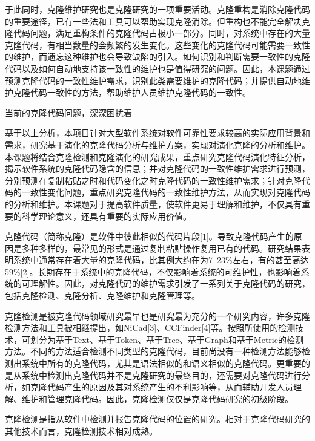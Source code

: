 于此同时，克隆维护研究也是克隆研究的一项重要活动。克隆重构是消除克隆代码的重要途径，已有一些法和工具可以帮助实现克隆消除。但重构也不能完全解决克隆代码问题，满足重构条件的克隆代码占极小一部分。同时，对系统中存在的大量克隆代码，有相当数量的会频繁的发生变化。这些变化的克隆代码可能需要一致性的维护，而遗忘这种维护也会导致缺陷的引入。如何识别和判断需要一致性的克隆代码以及如何自动地支持该一致性的维护也是值得研究的问题。因此，本课题通过预测克隆代码的一致性维护需求，识别此类需要维护的克隆代码；并提供自动地维护克隆代码一致性的方法，帮助维护人员维护克隆代码的一致性。

当前的克隆代码问题，深深困扰着

基于以上分析，本项目针对大型软件系统对软件可靠性要求较高的实际应用背景和需求，研究基于演化的克隆代码分析与维护方案，实现对演化克隆的分析和维护。本课题将结合克隆检测和克隆演化的研究成果，重点研究克隆代码演化特征分析，揭示软件系统的克隆代码隐含的信息；并对克隆代码的一致性维护需求进行预测，分别预测在复制粘贴之时和代码变化之时克隆代码的一致性维护需求；针对克隆代码的一致性变化问题，重点研究克隆代码的一致性维护方法，从而实现对克隆代码的分析和维护。本课题对于提高软件质量，使软件更易于理解和维护，不仅具有重要的科学理论意义，还具有重要的实际应用价值。



克隆代码（简称克隆）是软件中彼此相似的代码片段[1]。导致克隆代码产生的原因是多种多样的，最常见的形式是通过复制粘贴操作复用已有的代码。研究结果表明系统中通常存在着大量的克隆代码，比其例大约在为7~23\%左右，有的甚至高达59\%[2]。长期存在于系统中的克隆代码，不仅影响着系统的可维护性，也影响着系统的可理解性。因此，对克隆代码的维护需求引发了一系列关于克隆代码的研究，包括克隆检测、克隆分析、克隆维护和克隆管理等。


克隆检测是被克隆代码领域研究最早也是研究最为充分的一个研究内容，许多克隆检测方法和工具被相继提出，如NiCad[3]、CCFinder[4]等。按照所使用的检测技术，可划分为基于Text、基于Token、基于Tree、基于Graph和基于Metric的检测方法。不同的方法适合检测不同类型的克隆代码，目前尚没有一种检测方法能够检测出系统中所有的克隆代码，尤其是语法相似的和语义相似的克隆代码。更重要的是从系统中检测出克隆代码并不是克隆研究的最终目的，还需要对克隆代码进行分析，如克隆代码产生的原因及其对系统产生的不利影响等，从而辅助开发人员理解、维护和管理克隆代码。因此，克隆检测仅仅是克隆代码研究的初级阶段。

克隆检测是指从软件中检测并报告克隆代码的位置的研究。相对于克隆代码研究的其他技术而言，克隆检测技术相对成熟。


